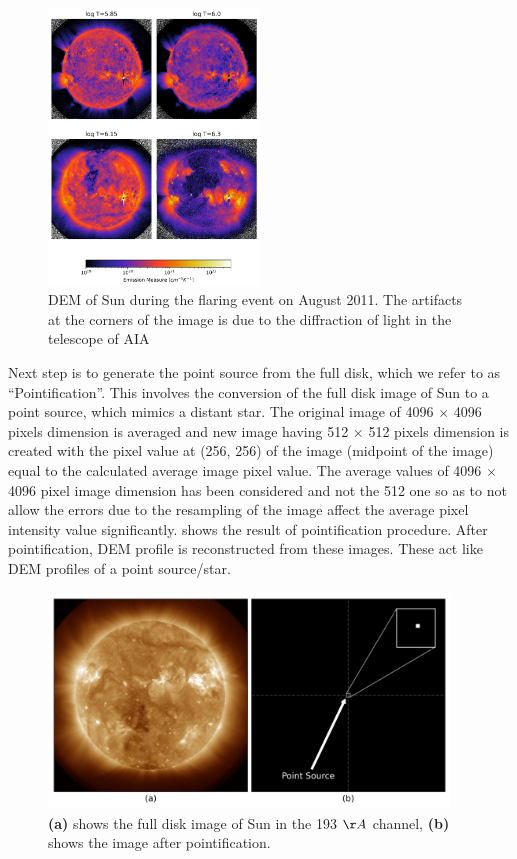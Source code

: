 \begin{figure}[h!]
    \centering
    \includegraphics[width=0.5\textwidth]{images/dem_img_aug_4_2011.png}
    \caption[DEM full disk image of Sun]{DEM of Sun during the flaring event on  August 2011. The artifacts at the corners of the image is due to the diffraction of light in the telescope of AIA}
    \label{fig:dem_img_aug_4_2011}
\end{figure}

Next step is to generate the point source from the full disk, which we refer to as ``Pointification''. This involves the conversion of the full disk image of Sun to a point source, which mimics a distant star. The original image of 4096 $\times$ 4096 pixels dimension is averaged and new image having 512 $\times$ 512 pixels dimension is created with the pixel value at (256, 256) of the image (midpoint of the image) equal to the calculated average image pixel value. The average values of 4096 $\times$ 4096 pixel image dimension has been considered and not the 512 one so as to not allow the errors due to the resampling of the image affect the average pixel intensity value significantly.  shows the result of pointification procedure. After pointification, DEM profile is reconstructed from these images. These act like DEM profiles of a point source/star.\\

\begin{figure}[h!]
    \centering
    \includegraphics[width=0.95\textwidth]{images/ps_plus_full_disk.png}
    \caption[Full disk and pointified image of Sun]{\textbf{(a)} shows the full disk image of Sun in the 193 $\AA$ channel, \textbf{(b)} shows the image after pointification.}
    \label{fig:ps_plus_full_disk}
\end{figure}

